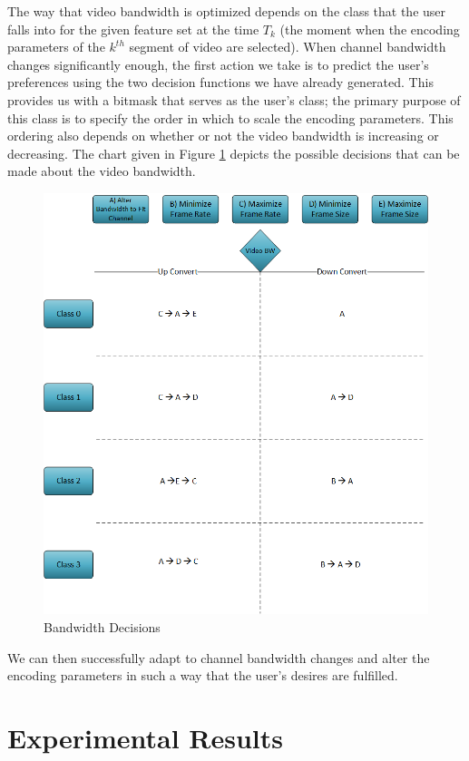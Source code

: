 \documentclass[preprint, 12pt]{elsarticle}
\begin{document}
The way that video bandwidth is optimized depends on the class that the user falls into for the given feature set at the time $T_k$ (the moment when the encoding parameters of the $k^{th}$ segment of video are selected). When channel bandwidth changes significantly enough, the first action we take is to predict the user’s preferences using the two decision functions we have already generated. This provides us with a bitmask that serves as the user’s class; the primary purpose of this class is to specify the order in which to scale the encoding parameters. This ordering also depends on whether or not the video bandwidth is increasing or decreasing. The chart given in Figure \ref{fig:ScalingDecisionChart} depicts the possible decisions that can be made about the video bandwidth.
\begin{figure}[h]
\centering
\includegraphics[width=0.7\linewidth]{BandwidthDecisions.png}
\caption{Bandwidth Decisions}
\label{fig:ScalingDecisionChart}
\end{figure}
We can then successfully adapt to channel bandwidth changes and alter the encoding parameters in such a way that the user’s desires are fulfilled.

\section{Experimental Results}
\label{sec:Results}
\end{document}
